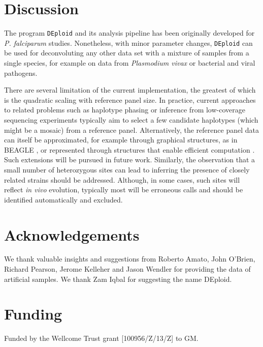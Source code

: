 \documentclass{bioinfo}
\begin{document}
\section{Discussion}

The program \texttt{DEploid} and its analysis pipeline has been originally developed for {\it P. falciparum} studies. Nonetheless, with minor parameter changes, \texttt{DEploid} can be used for deconvoluting any other data set with a mixture of samples from a single species, for example on data from {\it Plasmodium vivax} \citep{Pearson2016} or bacterial and viral pathogens.

There are several limitation of the current implementation, the greatest of which is the quadratic scaling with reference panel size.  In practice, current approaches to related problems such as haplotype phasing \citep{Delaneau2012} or inference from low-coverage sequencing experiments \citep{Davis2016} typically aim to select a few candidate haplotypes (which might be a mosaic) from a reference panel.  Alternatively, the reference panel data can itself be approximated, for example through graphical structures, as in BEAGLE \citep{Browning2007}, or represented through structures that enable efficient computation \citep{Lunter2016}.  Such extensions will be pursued in future work.  Similarly, the observation that a small number of heterozygous sites can lead to inferring the presence of closely related strains should be addressed. Although, in some cases, such sites will reflect {\it in vivo} evolution, typically most will be erroneous calls and should be identified automatically and excluded.


\section*{Acknowledgements}
We thank valuable insights and suggestions from Roberto Amato, John O'Brien, Richard Pearson, Jerome Kelleher and Jason Wendler for providing the data of artificial samples. We thank Zam Iqbal for suggesting the name DEploid.

\section*{Funding}
Funded by the Wellcome Trust grant [100956/Z/13/Z] to GM.\\
~\\
\end{document}
